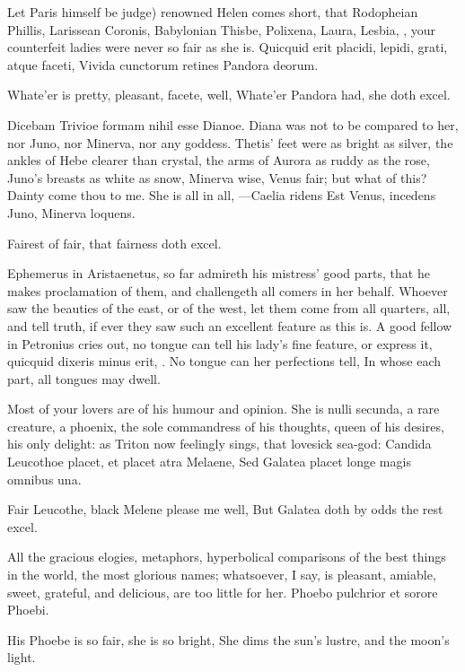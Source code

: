 {Let Paris himself be judge) renowned Helen comes short, that Rodopheian
Phillis, Larissean Coronis, Babylonian Thisbe, Polixena, Laura, Lesbia,
\etc{}, your counterfeit ladies were never so fair as she is.
Quicquid erit placidi, lepidi, grati, atque faceti,
Vivida cunctorum retines Pandora deorum.

Whate'er is pretty, pleasant, facete, well,
Whate'er Pandora had, she doth excel.

Dicebam Trivioe formam nihil esse Dianoe. Diana was not to be
compared to her, nor Juno, nor Minerva, nor any goddess. Thetis' feet
were as bright as silver, the ankles of Hebe clearer than crystal, the
arms of Aurora as ruddy as the rose, Juno's breasts as white as snow,
Minerva wise, Venus fair; but what of this? Dainty come thou to me. She
is all in all,
---Caelia ridens
Est Venus, incedens Juno, Minerva loquens.

Fairest of fair, that fairness doth excel.

Ephemerus in Aristaenetus, so far admireth his mistress' good parts,
that he makes proclamation of them, and challengeth all comers in her
behalf. Whoever saw the beauties of the east, or of the west, let
them come from all quarters, all, and tell truth, if ever they saw such
an excellent feature as this is. A good fellow in Petronius cries out,
no tongue can tell his lady's fine feature, or express it,
quicquid dixeris minus erit, \etc{}.
No tongue can her perfections tell,
In whose each part, all tongues may dwell.

Most of your lovers are of his humour and opinion. She is nulli
secunda, a rare creature, a phoenix, the sole commandress of his
thoughts, queen of his desires, his only delight: as Triton now
feelingly sings, that lovesick sea-god:
Candida Leucothoe placet, et placet atra Melaene,
Sed Galatea placet longe magis omnibus una.

Fair Leucothe, black Melene please me well,
But Galatea doth by odds the rest excel.

All the gracious elogies, metaphors, hyperbolical comparisons of the
best things in the world, the most glorious names; whatsoever, I say,
is pleasant, amiable, sweet, grateful, and delicious, are too little
for her.
Phoebo pulchrior et sorore Phoebi.

His Phoebe is so fair, she is so bright,
She dims the sun's lustre, and the moon's light.

}
